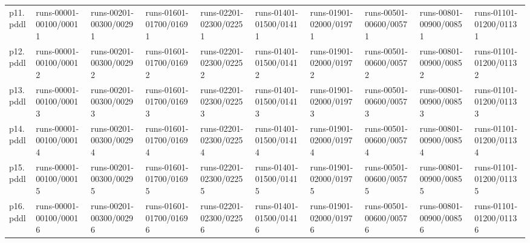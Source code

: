 \documentclass{article}
\begin{document}
\begin{tabular}{@{}lrrrrrrrrr@{}}
p11.pddl & \multicolumn{1}{|l|}{runs-00001-00100/00011} & \multicolumn{1}{|l|}{runs-00201-00300/00291} & \multicolumn{1}{|l|}{runs-01601-01700/01691} & \multicolumn{1}{|l|}{runs-02201-02300/02251} & \multicolumn{1}{|l|}{runs-01401-01500/01411} & \multicolumn{1}{|l|}{runs-01901-02000/01971} & \multicolumn{1}{|l|}{runs-00501-00600/00571} & \multicolumn{1}{|l|}{runs-00801-00900/00851} & \multicolumn{1}{|l|}{runs-01101-01200/01131} \\
p12.pddl & \multicolumn{1}{|l|}{runs-00001-00100/00012} & \multicolumn{1}{|l|}{runs-00201-00300/00292} & \multicolumn{1}{|l|}{runs-01601-01700/01692} & \multicolumn{1}{|l|}{runs-02201-02300/02252} & \multicolumn{1}{|l|}{runs-01401-01500/01412} & \multicolumn{1}{|l|}{runs-01901-02000/01972} & \multicolumn{1}{|l|}{runs-00501-00600/00572} & \multicolumn{1}{|l|}{runs-00801-00900/00852} & \multicolumn{1}{|l|}{runs-01101-01200/01132} \\
p13.pddl & \multicolumn{1}{|l|}{runs-00001-00100/00013} & \multicolumn{1}{|l|}{runs-00201-00300/00293} & \multicolumn{1}{|l|}{runs-01601-01700/01693} & \multicolumn{1}{|l|}{runs-02201-02300/02253} & \multicolumn{1}{|l|}{runs-01401-01500/01413} & \multicolumn{1}{|l|}{runs-01901-02000/01973} & \multicolumn{1}{|l|}{runs-00501-00600/00573} & \multicolumn{1}{|l|}{runs-00801-00900/00853} & \multicolumn{1}{|l|}{runs-01101-01200/01133} \\
p14.pddl & \multicolumn{1}{|l|}{runs-00001-00100/00014} & \multicolumn{1}{|l|}{runs-00201-00300/00294} & \multicolumn{1}{|l|}{runs-01601-01700/01694} & \multicolumn{1}{|l|}{runs-02201-02300/02254} & \multicolumn{1}{|l|}{runs-01401-01500/01414} & \multicolumn{1}{|l|}{runs-01901-02000/01974} & \multicolumn{1}{|l|}{runs-00501-00600/00574} & \multicolumn{1}{|l|}{runs-00801-00900/00854} & \multicolumn{1}{|l|}{runs-01101-01200/01134} \\
p15.pddl & \multicolumn{1}{|l|}{runs-00001-00100/00015} & \multicolumn{1}{|l|}{runs-00201-00300/00295} & \multicolumn{1}{|l|}{runs-01601-01700/01695} & \multicolumn{1}{|l|}{runs-02201-02300/02255} & \multicolumn{1}{|l|}{runs-01401-01500/01415} & \multicolumn{1}{|l|}{runs-01901-02000/01975} & \multicolumn{1}{|l|}{runs-00501-00600/00575} & \multicolumn{1}{|l|}{runs-00801-00900/00855} & \multicolumn{1}{|l|}{runs-01101-01200/01135} \\
p16.pddl & \multicolumn{1}{|l|}{runs-00001-00100/00016} & \multicolumn{1}{|l|}{runs-00201-00300/00296} & \multicolumn{1}{|l|}{runs-01601-01700/01696} & \multicolumn{1}{|l|}{runs-02201-02300/02256} & \multicolumn{1}{|l|}{runs-01401-01500/01416} & \multicolumn{1}{|l|}{runs-01901-02000/01976} & \multicolumn{1}{|l|}{runs-00501-00600/00576} & \multicolumn{1}{|l|}{runs-00801-00900/00856} & \multicolumn{1}{|l|}{runs-01101-01200/01136} \\

\end{tabular}
\end{document}
